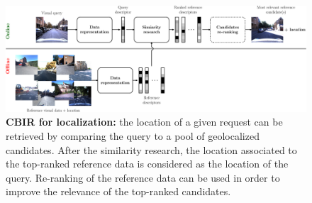 \begin{figure}[t]
	\centering

	\includegraphics[width=\linewidth]{methods/cbir_for_localization}
	\caption[CBIR for localization]{\label{fig:cbir_for_localization}\textbf{CBIR for localization:} the location of a given request can be retrieved by comparing the query to a pool of geolocalized candidates. After the similarity research, the location associated to the top-ranked reference data is considered as the location of the query. Re-ranking of the reference data can be used in order to improve the relevance of the top-ranked candidates.}
\end{figure}
